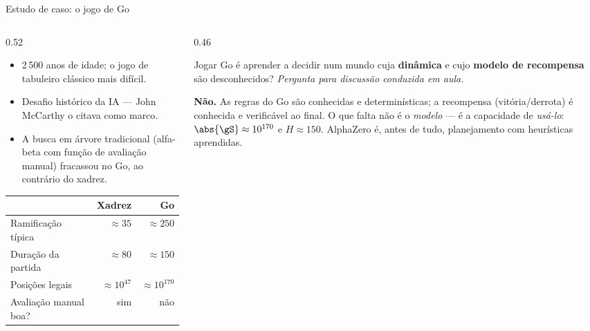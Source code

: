 \documentclass[aspectratio=169, 10pt]{beamer}
\newcommand{\paradiscussao}{\smallskip
  {\footnotesize\color{rlCinza}\itshape Pergunta para discussão conduzida em aula.}}
\begin{document}
\begin{frame}{Estudo de caso: o jogo de Go}
  \footnotesize
  \begin{columns}[T]
    \begin{column}{0.52\textwidth}
      \begin{itemize}
        \item 2\,500 anos de idade; o jogo de tabuleiro clássico mais difícil.
        \item Desafio histórico da IA — John McCarthy o citava como marco.
        \item A busca em árvore tradicional (alfa-beta com função de avaliação
              manual) \alert{fracassou} no Go, ao contrário do xadrez.
      \end{itemize}
      \medskip
      \begin{center}
      \tiny
      \begin{tabular}{lrr}
        \toprule
         & \textbf{Xadrez} & \textbf{Go} \\
        \midrule
        Ramificação típica      & $\approx 35$   & $\approx 250$ \\
        Duração da partida      & $\approx 80$   & $\approx 150$ \\
        Posições legais         & $\approx 10^{47}$ & $\approx 10^{170}$ \\
        Avaliação manual boa?   & sim            & \alert{não} \\
        \bottomrule
      \end{tabular}
      \end{center}
    \end{column}
    \begin{column}{0.46\textwidth}
      \begin{quizbox}{}
        Jogar Go é aprender a decidir num mundo cuja \textbf{dinâmica} e cujo
        \textbf{modelo de recompensa} são desconhecidos?
        \paradiscussao
      \end{quizbox}
      \pause
      \vspace{-0.3em}
      \begin{respbox}
        \textbf{Não.} As regras do Go são conhecidas e determinísticas; a
        recompensa (vitória/derrota) é conhecida e verificável ao final. O que
        falta não é o \emph{modelo} — é a capacidade de \emph{usá-lo}:
        $\abs{\gS}\approx 10^{170}$ e $H \approx 150$. AlphaZero é, antes de tudo,
        \alert{planejamento} com heurísticas aprendidas.
      \end{respbox}
    \end{column}
  \end{columns}
\end{frame}
\end{document}
